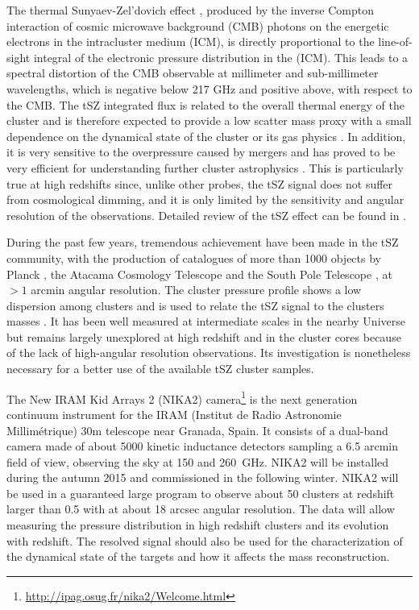 \documentclass[twocolumn,traditabstract]{aa}
\begin{document}
The thermal Sunyaev-Zel'dovich effect \citep[tSZ,][]{sunyaev1972,sunyaev1980}, produced by the inverse Compton interaction of cosmic microwave background (CMB) photons on the energetic electrons in the intracluster medium (ICM), is directly proportional to the line-of-sight integral of the electronic pressure distribution in the (ICM). This leads to a spectral distortion of the CMB observable at millimeter and sub-millimeter wavelengths, which is negative below 217 GHz and positive above, with respect to the CMB. The tSZ integrated flux is related to the overall thermal energy of the cluster and is therefore expected to provide a low scatter mass proxy with a small dependence on the dynamical state of the cluster or its gas physics \citep[e.g.][]{dasilva2004,motl2005,nagai2006}. In addition, it is very sensitive to the overpressure caused by mergers and has proved to be very efficient for understanding further cluster astrophysics \citep[see for example results by][]{pointecouteau1999,komatsu2001,korngut2011,adam2013,young2014,adam2014,mroczkowski2015}. This is particularly true at high redshifts since, unlike other probes, the tSZ signal does not suffer from cosmological dimming, and it is only limited by the sensitivity and angular resolution of the observations. Detailed review of the tSZ effect can be found in \cite{birkinshaw1999,carlstrom2002,kitayama2014}.

During the past few years, tremendous achievement have been made in the tSZ community, with the production of catalogues of more than 1000 objects by Planck \citep{planck2013catalogue}, the Atacama Cosmology Telescope \citep[ACT,][]{hasselfield2013} and the South Pole Telescope \citep[SPT,][]{reichardt2013,bleem2014}, at $>1$ arcmin angular resolution. The cluster pressure profile shows a low dispersion among clusters and is used to relate the tSZ signal to the clusters masses \citep{arnaud2010}. It has been well measured at intermediate scales in the nearby Universe \citep{planck2013pressure_profile,sayers2013b} but remains largely unexplored at high redshift and in the cluster cores because of the lack of high-angular resolution observations. Its investigation is nonetheless necessary for a better use of the available tSZ cluster samples.

The New IRAM Kid Arrays 2 (NIKA2) camera\footnote{\url{http://ipag.osug.fr/nika2/Welcome.html}} is the next generation continuum instrument for the IRAM (Institut de Radio Astronomie Millim\'etrique) 30m telescope near Granada, Spain. It consists of a dual-band camera made of about 5000 kinetic inductance detectors sampling a 6.5 arcmin field of view, observing the sky at 150 and 260~GHz. NIKA2 will be installed during the autumn 2015 and commissioned in the following winter. NIKA2 will be used in a guaranteed large program to observe about 50 clusters at redshift larger than 0.5 with at about 18 arcsec angular resolution. The data will allow measuring the pressure distribution in high redshift clusters and its evolution with redshift. The resolved signal should also be used for the characterization of the dynamical state of the targets and how it affects the mass reconstruction. 
\end{document}
